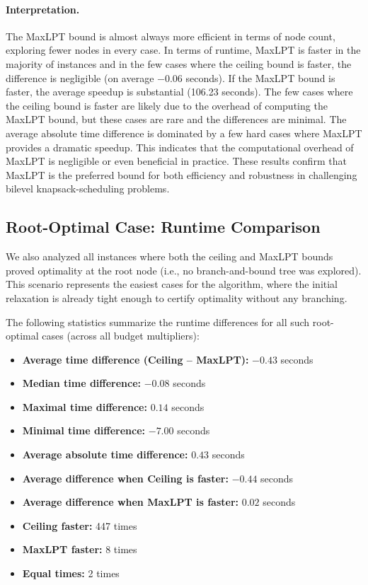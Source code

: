 \paragraph{Interpretation.}
The MaxLPT bound is almost always more efficient in terms of node count, 
exploring fewer nodes in every case. In terms of runtime, MaxLPT is faster in the majority of instances and in the few cases where the ceiling bound is faster, the difference is negligible (on average $-$0.06 seconds). 
If the MaxLPT bound is faster, the average speedup is substantial (106.23 seconds). The few cases where the ceiling bound is faster are likely due to the overhead of computing the MaxLPT bound, but these cases are rare and the differences are minimal.
The average absolute time difference is dominated by a few hard cases where MaxLPT provides a dramatic speedup. 
This indicates that the computational overhead of MaxLPT is negligible or even beneficial in practice. 
These results confirm that MaxLPT is the preferred bound for both efficiency and robustness in challenging bilevel knapsack-scheduling problems.

\subsection{Root-Optimal Case: Runtime Comparison}

We also analyzed all instances where both the ceiling and MaxLPT bounds proved optimality at the root node 
(i.e., no branch-and-bound tree was explored).
 This scenario represents the easiest cases for the algorithm, where the initial relaxation is already tight enough to certify optimality without any branching.

The following statistics summarize the runtime differences for all such root-optimal cases (across all budget multipliers):

\begin{itemize}
    \item \textbf{Average time difference (Ceiling -- MaxLPT):} $-0.43$ seconds
    \item \textbf{Median time difference:} $-0.08$ seconds
    \item \textbf{Maximal time difference:} $0.14$ seconds
    \item \textbf{Minimal time difference:} $-7.00$ seconds
    \item \textbf{Average absolute time difference:} $0.43$ seconds
    \item \textbf{Average difference when Ceiling is faster:} $-0.44$ seconds
    \item \textbf{Average difference when MaxLPT is faster:} $0.02$ seconds
    \item \textbf{Ceiling faster:} 447 times
    \item \textbf{MaxLPT faster:} 8 times
    \item \textbf{Equal times:} 2 times
\end{itemize}

